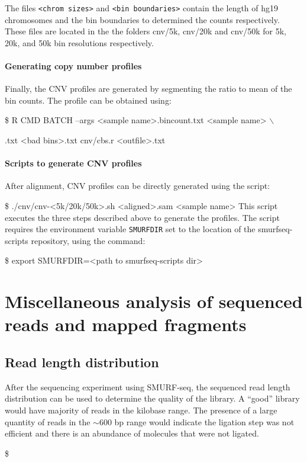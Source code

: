 \documentclass[11pt]{article}
\newenvironment{cmd}
{\list{}{
    \parsep=0em
    \itemindent=17pt
    \listparindent=50pt
    \leftmargin=0in
    \rightmargin=0in
  }\item[] \ttfamily \$}
{\endlist}
\begin{document}
The files \texttt{<chrom sizes>} and \texttt{<bin boundaries>} contain the
length of hg19 chromosomes and the bin boundaries to determined the counts
respectively. These files are located in the the folders cnv/5k, cnv/20k
and cnv/50k for 5k, 20k, and 50k bin resolutions respectively.

\paragraph{Generating copy number profiles}
Finally, the CNV profiles are generated by segmenting the ratio to mean of
the bin counts. The profile can be obtained using:
\begin{cmd}
  R CMD BATCH --args <sample name>.bincount.txt <sample name> $\backslash$
    \par <GC content>.txt <bad bins>.txt cnv/cbs.r <outfile>.txt
\end{cmd}

\paragraph{Scripts to generate CNV profiles}
After alignment, CNV profiles can be directly generated using the script:
\begin{cmd}
  ./cnv/cnv-<5k/20k/50k>.sh <aligned>.sam <sample name>
\end{cmd}
This script executes the three steps described above to generate the profiles.
The script requires the environment variable \texttt{SMURFDIR} set to the
location of the smurfseq-scripts repository, using the command:
\begin{cmd}
  export SMURFDIR=<path to smurfseq-scripts dir>
\end{cmd}



\section{Miscellaneous analysis of sequenced reads and mapped fragments}
\label{misc}

\subsection{Read length distribution}
After the sequencing experiment using SMURF-seq, the sequenced read length
distribution can be used to determine the quality of the library. A ``good''
library would have majority of reads in the kilobase range. The presence
of a large quantity of reads in the $\sim$600 bp range would indicate 
the ligation step was not efficient and there is an abundance of 
molecules that were not ligated.
\begin{cmd}

\end{cmd}
\end{document}
